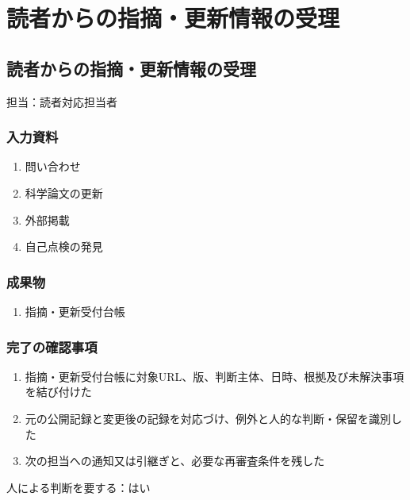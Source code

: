 \documentclass[a4paper,11pt]{article}
\begin{document}
\section{読者からの指摘・更新情報の受理}
\subsection{読者からの指摘・更新情報の受理}
\par 担当：読者対応担当者\par\medskip
\subsubsection*{入力資料}
\begin{enumerate}[leftmargin=2em,itemsep=0.35em]
\item 問い合わせ
\item 科学論文の更新
\item 外部掲載
\item 自己点検の発見
\end{enumerate}
\subsubsection*{成果物}
\begin{enumerate}[leftmargin=2em,itemsep=0.35em]
\item 指摘・更新受付台帳
\end{enumerate}
\subsubsection*{完了の確認事項}
\begin{enumerate}[leftmargin=2em,itemsep=0.35em]
\item 指摘・更新受付台帳に対象URL、版、判断主体、日時、根拠及び未解決事項を結び付けた
\item 元の公開記録と変更後の記録を対応づけ、例外と人的な判断・保留を識別した
\item 次の担当への通知又は引継ぎと、必要な再審査条件を残した
\end{enumerate}
\par 人による判断を要する：はい\par\medskip
\end{document}
